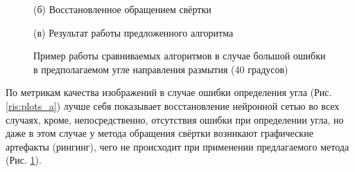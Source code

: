 \begin{figure}[H]
\begin{minipage}[t]{0.3\linewidth}
(б) Восстановленное обращением свёртки\\ 
\end{minipage}
\hfill
\begin{minipage}[t]{0.3\linewidth}
(в) Результат работы предложенного алгоритма\\ 
\end{minipage}
\caption{ Пример работы сравниваемых алгоритмов в случае большой ошибки в предполагаемом угле направления размытия (40 градусов) }
\label{ris:Wrong_angle}
\end{figure}

По метрикам качества изображений в случае ошибки определения угла (Рис. \ref{ris:plots_a}) лучше себя показывает восстановление нейронной сетью во всех случаях, кроме, непосредственно, отсутствия ошибки при определении угла, но даже в этом случае у метода обращения свёртки возникают графические артефакты (рингинг), чего не происходит при применении предлагаемого метода (Рис. \ref{ris:Wrong_angle}).

